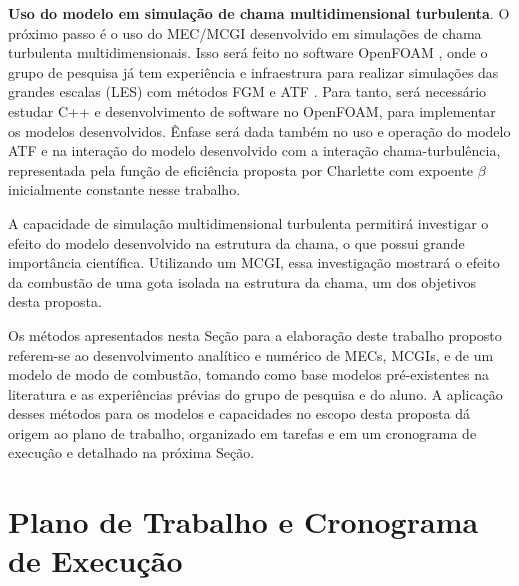 \textbf{Uso do modelo em simulação de chama multidimensional turbulenta}.
O próximo passo é o uso do MEC/MCGI desenvolvido em simulações de chama turbulenta multidimensionais.
Isso será feito no software OpenFOAM \cite{JasakOpenFOAM}, onde o grupo de pesquisa já tem experiência e infraestrura para realizar simulações das grandes escalas (LES) com métodos FGM e ATF \cite{SacomanoF2017PhD,SacomanoF2017CF,SacomanoF2020CF}.
Para tanto, será necessário estudar C++ e desenvolvimento de software no OpenFOAM, para implementar os modelos desenvolvidos.
Ênfase será dada também no uso e operação do modelo ATF e na interação do modelo desenvolvido com a interação chama-turbulência, representada pela função de eficiência proposta por Charlette \cite{CharletteF2002} com expoente $\beta$ inicialmente constante nesse trabalho. 

A capacidade de simulação multidimensional turbulenta permitirá investigar o efeito do modelo desenvolvido na estrutura da chama, o que possui grande importância científica.
Utilizando um MCGI, essa investigação mostrará o efeito da combustão de uma gota isolada na estrutura da chama, um dos objetivos desta proposta.

Os métodos apresentados nesta Seção para a elaboração deste trabalho proposto referem-se ao desenvolvimento analítico e numérico de MECs, MCGIs, e de um modelo de modo de combustão, tomando como base modelos pré-existentes na literatura e as experiências prévias do grupo de pesquisa e do aluno.
A aplicação desses métodos para os modelos e capacidades no escopo desta proposta dá origem ao plano de trabalho, organizado em tarefas e em um cronograma de execução e detalhado na próxima Seção.

\section{Plano de Trabalho e Cronograma de Execução}


